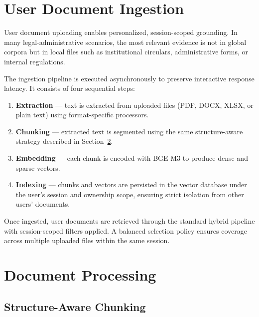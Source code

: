 \documentclass[12pt, a4paper]{article}
\begin{document}
\section{User Document Ingestion}

User document uploading enables personalized, session-scoped grounding. In many
legal-administrative scenarios, the most relevant evidence is not in global corpora
but in local files such as institutional circulars, administrative forms, or
internal regulations.

The ingestion pipeline is executed asynchronously to preserve interactive response
latency. It consists of four sequential steps:

\begin{enumerate}[leftmargin=1.8em, itemsep=0.2em]
  \item \textbf{Extraction} --- text is extracted from uploaded files
        (PDF, DOCX, XLSX, or plain text) using format-specific processors.
  \item \textbf{Chunking} --- extracted text is segmented using the same
        structure-aware strategy described in Section~\ref{sec:chunking}.
  \item \textbf{Embedding} --- each chunk is encoded with BGE-M3 to produce
        dense and sparse vectors.
  \item \textbf{Indexing} --- chunks and vectors are persisted in the vector
        database under the user's session and ownership scope, ensuring strict
        isolation from other users' documents.
\end{enumerate}

Once ingested, user documents are retrieved through the standard hybrid pipeline
with session-scoped filters applied. A balanced selection policy ensures coverage
across multiple uploaded files within the same session.

\section{Document Processing}
\label{sec:chunking}

\subsection{Structure-Aware Chunking}
\end{document}

